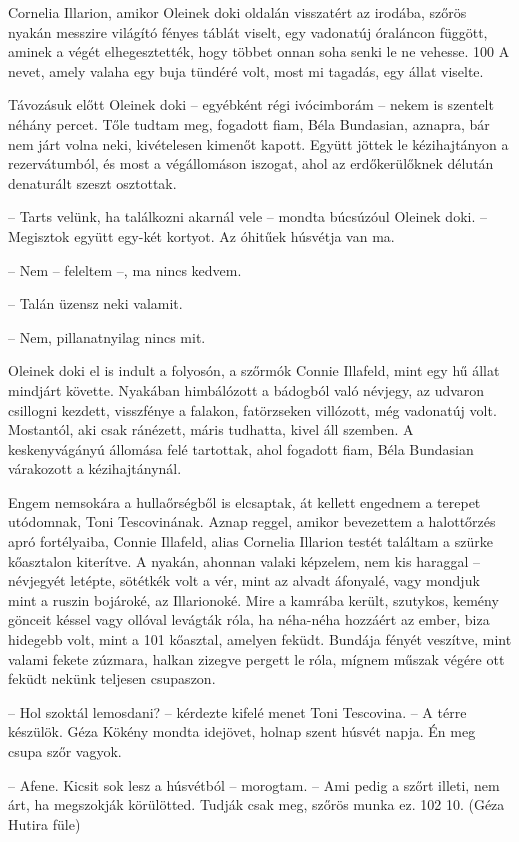 \documentclass{IEEEtran}
\begin{document}
Cornelia Illarion, amikor Oleinek doki oldalán visszatért az irodába, szőrös
nyakán messzire világító fényes táblát viselt, egy vadonatúj óraláncon
függött, aminek a végét elhegesztették, hogy többet onnan soha senki le ne
vehesse. 100 A nevet, amely valaha egy buja tündéré volt, most mi tagadás, egy
állat viselte.

Távozásuk előtt Oleinek doki – egyébként régi ivócimborám – nekem is szentelt
néhány percet. Tőle tudtam meg, fogadott fiam, Béla Bundasian, aznapra, bár
nem járt volna neki, kivételesen kimenőt kapott. Együtt jöttek le
kézihajtányon a rezervátumból, és most a végállomáson iszogat, ahol az
erdőkerülőknek délután denaturált szeszt osztottak.

– Tarts velünk, ha találkozni akarnál vele – mondta búcsúzóul Oleinek doki. –
Megisztok együtt egy-két kortyot. Az óhitűek húsvétja van ma.

– Nem – feleltem –, ma nincs kedvem.

– Talán üzensz neki valamit.

– Nem, pillanatnyilag nincs mit.

Oleinek doki el is indult a folyosón, a szőrmók Connie Illafeld, mint egy hű
állat mindjárt követte. Nyakában himbálózott a bádogból való névjegy, az
udvaron csillogni kezdett, visszfénye a falakon, fatörzseken villózott, még
vadonatúj volt. Mostantól, aki csak ránézett, máris tudhatta, kivel áll
szemben. A keskenyvágányú állomása felé tartottak, ahol fogadott fiam, Béla
Bundasian várakozott a kézihajtánynál.

Engem nemsokára a hullaőrségből is elcsaptak, át kellett engednem a terepet
utódomnak, Toni Tescovinának. Aznap reggel, amikor bevezettem a halottőrzés
apró fortélyaiba, Connie Illafeld, alias Cornelia Illarion testét találtam a
szürke kőasztalon kiterítve. A nyakán, ahonnan valaki képzelem, nem kis
haraggal – névjegyét letépte, sötétkék volt a vér, mint az alvadt áfonyalé,
vagy mondjuk mint a ruszin bojároké, az Illarionoké. Mire a kamrába került,
szutykos, kemény gönceit késsel vagy ollóval levágták róla, ha néha-néha
hozzáért az ember, biza hidegebb volt, mint a 101 kőasztal, amelyen feküdt.
Bundája fényét veszítve, mint valami fekete zúzmara, halkan zizegve pergett le
róla, mígnem műszak végére ott feküdt nekünk teljesen csupaszon.

– Hol szoktál lemosdani? – kérdezte kifelé menet Toni Tescovina. – A térre
készülök. Géza Kökény mondta idejövet, holnap szent húsvét napja. Én meg csupa
szőr vagyok.

– Afene. Kicsit sok lesz a húsvétból – morogtam. – Ami pedig a szőrt illeti,
nem árt, ha megszokják körülötted. Tudják csak meg, szőrös munka ez.
102
10. (Géza Hutira füle)
\end{document}
